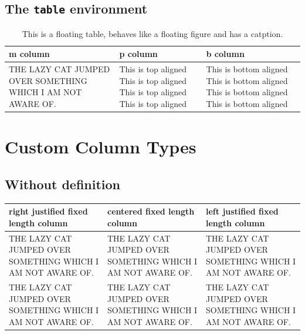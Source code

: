 \documentclass[a4paper,12pt]{article}
\begin{document}
\subsection{The \texttt{table} environment}
\begin{table}[H]
    \begin{tabular}{ || m{.3\linewidth} | p{.3\linewidth} | b{.3\linewidth} ||}
        \hline
        m column & p column & b column \\
        \hline
        THE LAZY CAT JUMPED OVER SOMETHING WHICH I AM NOT AWARE OF. & This is top aligned This is top aligned This is top aligned This is top aligned  & This is bottom aligned This is bottom \newline aligned This is bottom aligned This is bottom aligned  \\
        \hline
        
    \end{tabular}
    \caption{This is a floating table, behaves like a floating figure and has a catption.}
\end{table}
 
\newpage

\section{Custom Column Types}

\subsection{Without definition}

\begin{center}
    \begin{tabular}{ || >{\raggedleft\arraybackslash}m{.3\linewidth} | >{\centering\arraybackslash}m{.3\linewidth} | >{\raggedright\arraybackslash}m{.3\linewidth} ||}
        \hline
        right justified fixed length column & centered fixed length column & left justified fixed length column \\
        \hline
        THE LAZY CAT JUMPED OVER SOMETHING WHICH I AM NOT AWARE OF. & THE LAZY CAT JUMPED OVER SOMETHING WHICH I AM NOT AWARE OF. & THE LAZY CAT JUMPED OVER SOMETHING WHICH I AM NOT AWARE OF. \\
        \hline
        THE LAZY CAT JUMPED OVER SOMETHING WHICH I AM NOT AWARE OF. & THE LAZY CAT JUMPED OVER SOMETHING WHICH I AM NOT AWARE OF. & THE LAZY CAT JUMPED OVER SOMETHING WHICH I AM NOT AWARE OF. \\
        \hline
        
        
    \end{tabular}
\end{center}
\end{document}
